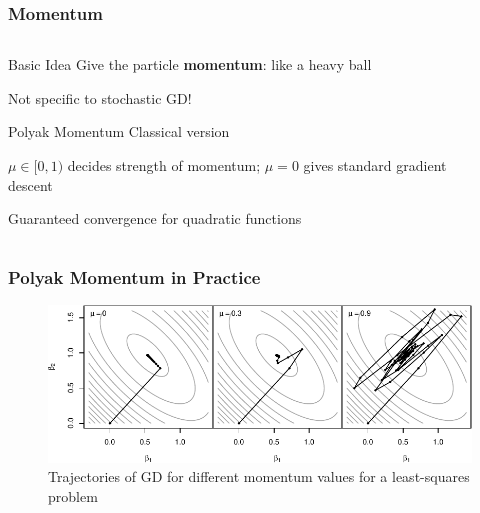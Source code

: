 \documentclass[aspectratio=1610,onlytextwidth]{beamer}
\begin{document}
\begin{frame}
  \frametitle{Momentum}

  \begin{columns}
    \begin{column}{0.45\textwidth}
      \begin{block}{Basic Idea}
        Give the particle \textbf{momentum}: like a heavy ball

        \medskip

        Not specific to stochastic GD!
      \end{block}

      \pause

      \begin{block}{Polyak Momentum}
        Classical version~\parencite{polyakMethodsSpeedingConvergence1964}

        \medskip

        $\mu \in [0, 1)$ decides strength of momentum; $\mu = 0$ gives standard gradient descent

        \medskip

        Guaranteed convergence for quadratic functions
      \end{block}
    \end{column}
    \begin{column}{0.45\textwidth}
      \begin{algorithm}[H]
        \KwData{$\gamma >0$, $\mu \in [0,1)$, $x_{-1} = x_0$}
        \caption{GD with Polyak Momentum}
      \end{algorithm}
    \end{column}
  \end{columns}

\end{frame}

\begin{frame}[c]
  \frametitle{Polyak Momentum in Practice}

  \begin{figure}[htpb]
    \centering
    \includegraphics[]{images/momentum-surface.pdf}
    \caption{%
      Trajectories of GD for different momentum values for a least-squares problem
    }
  \end{figure}

\end{frame}
\end{document}
